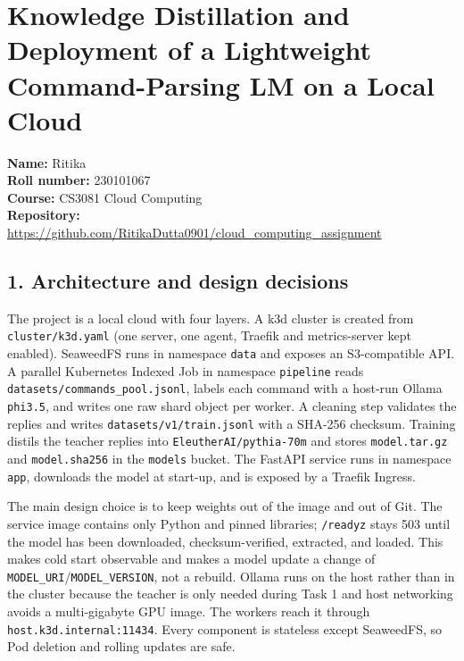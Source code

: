 \documentclass[
]{article}
\author{}
\date{}
\begin{document}
\hypertarget{knowledge-distillation-and-deployment-of-a-lightweight-command-parsing-lm-on-a-local-cloud}{%
\section{Knowledge Distillation and Deployment of a Lightweight
Command-Parsing LM on a Local
Cloud}\label{knowledge-distillation-and-deployment-of-a-lightweight-command-parsing-lm-on-a-local-cloud}}

\textbf{Name:} Ritika\\
\textbf{Roll number:} 230101067\\
\textbf{Course:} CS3081 Cloud Computing\\
\textbf{Repository:}
\url{https://github.com/RitikaDutta0901/cloud_computing_assignment}

\hypertarget{architecture-and-design-decisions}{%
\subsection{1. Architecture and design
decisions}\label{architecture-and-design-decisions}}

The project is a local cloud with four layers. A k3d cluster is created
from \texttt{cluster/k3d.yaml} (one server, one agent, Traefik and
metrics-server kept enabled). SeaweedFS runs in namespace \texttt{data}
and exposes an S3-compatible API. A parallel Kubernetes Indexed Job in
namespace \texttt{pipeline} reads
\texttt{datasets/commands\_pool.jsonl}, labels each command with a
host-run Ollama \texttt{phi3.5}, and writes one raw shard object per
worker. A cleaning step validates the replies and writes
\texttt{datasets/v1/train.jsonl} with a SHA-256 checksum. Training
distils the teacher replies into \texttt{EleutherAI/pythia-70m} and
stores \texttt{model.tar.gz} and \texttt{model.sha256} in the
\texttt{models} bucket. The FastAPI service runs in namespace
\texttt{app}, downloads the model at start-up, and is exposed by a
Traefik Ingress.

The main design choice is to keep weights out of the image and out of
Git. The service image contains only Python and pinned libraries;
\texttt{/readyz} stays 503 until the model has been downloaded,
checksum-verified, extracted, and loaded. This makes cold start
observable and makes a model update a change of
\texttt{MODEL\_URI}/\texttt{MODEL\_VERSION}, not a rebuild. Ollama runs
on the host rather than in the cluster because the teacher is only
needed during Task 1 and host networking avoids a multi-gigabyte GPU
image. The workers reach it through \texttt{host.k3d.internal:11434}.
Every component is stateless except SeaweedFS, so Pod deletion and
rolling updates are safe.
\end{document}
